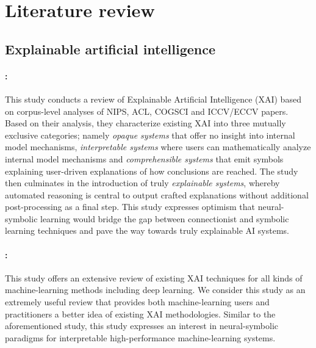 
\section{Literature review}

\subsection{Explainable artificial intelligence}

\paragraph{\citealt{doran2017does}:} This study conducts a review of Explainable Artificial Intelligence (XAI) based on corpus-level analyses of NIPS, ACL, COGSCI and ICCV/ECCV papers. Based on their analysis, they characterize existing XAI into three mutually exclusive categories; namely \textit{opaque systems} that offer no insight into internal model mechanisms, \textit{interpretable systems} where users can mathematically analyze internal model mechanisms and \textit{comprehensible systems} that emit symbols explaining user-driven explanations of how conclusions are reached. The study then culminates in the introduction of truly \textit{explainable systems}, whereby automated reasoning is central to output crafted explanations without additional post-processing as a final step. This study expresses optimism that neural-symbolic learning would bridge the gap between connectionist and symbolic learning techniques and pave the way towards truly explainable AI systems.

\paragraph{\citealt{arrieta2020explainable}:} This study offers an extensive review of existing XAI techniques for all kinds of machine-learning methods including deep learning. We consider this study as an extremely useful review that provides both machine-learning users and practitioners a better idea of existing XAI methodologies. Similar to the aforementioned study, this study expresses an interest in neural-symbolic paradigms for interpretable high-performance machine-learning systems.

